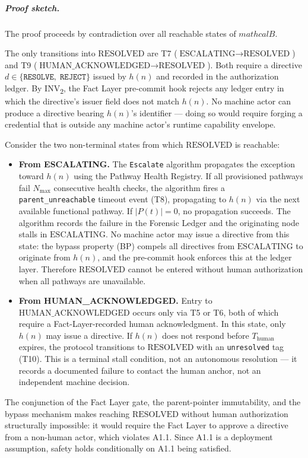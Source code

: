 \subparagraph{Proof sketch.} The proof proceeds by contradiction over all reachable states of $mathcal{B}$.

The only transitions into $\text{RESOLVED}$ are T7 ($\text{ESCALATING} \rightarrow \text{RESOLVED}$) and T9 ($\text{HUMAN\_ACKNOWLEDGED} \rightarrow \text{RESOLVED}$). Both require a directive $d \in \{\texttt{RESOLVE},\; \texttt{REJECT}\}$ issued by $h(n)$ and recorded in the authorization ledger. By INV\textsubscript{2}, the Fact Layer pre-commit hook rejects any ledger entry in which the directive's issuer field does not match $h(n)$. No machine actor can produce a directive bearing $h(n)$'s identifier — doing so would require forging a credential that is outside any machine actor's runtime capability envelope.

Consider the two non-terminal states from which $\text{RESOLVED}$ is reachable:

\begin{itemize}
\item \textbf{From ESCALATING.} The \texttt{Escalate} algorithm propagates the exception toward $h(n)$ using the Pathway Health Registry. If all provisioned pathways fail $N_{\max}$ consecutive health checks, the algorithm fires a \texttt{parent\_unreachable} timeout event (T8), propagating to $h(n)$ via the next available functional pathway. If $|P(t)| = 0$, no propagation succeeds. The algorithm records the failure in the Forensic Ledger and the originating node stalls in $\text{ESCALATING}$. No machine actor may issue a directive from this state: the bypass property (BP) compels all directives from $\text{ESCALATING}$ to originate from $h(n)$, and the pre-commit hook enforces this at the ledger layer. Therefore $\text{RESOLVED}$ cannot be entered without human authorization when all pathways are unavailable.

\item \textbf{From HUMAN\_ACKNOWLEDGED.} Entry to $\text{HUMAN\_ACKNOWLEDGED}$ occurs only via T5 or T6, both of which require a Fact-Layer-recorded human acknowledgment. In this state, only $h(n)$ may issue a directive. If $h(n)$ does not respond before $T_{\text{human}}$ expires, the protocol transitions to $\text{RESOLVED}$ with an \texttt{unresolved} tag (T10). This is a terminal stall condition, not an autonomous resolution — it records a documented failure to contact the human anchor, not an independent machine decision.
\end{itemize}

The conjunction of the Fact Layer gate, the parent-pointer immutability, and the bypass mechanism makes reaching $\text{RESOLVED}$ without human authorization structurally impossible: it would require the Fact Layer to approve a directive from a non-human actor, which violates A1.1. Since A1.1 is a deployment assumption, safety holds conditionally on A1.1 being satisfied.

